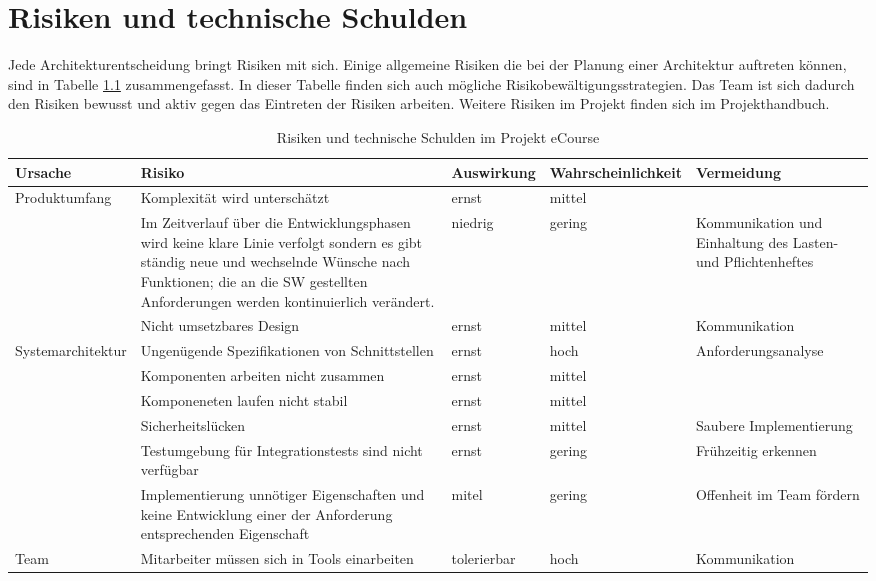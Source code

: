 \chapter{Risiken und technische Schulden}
Jede Architekturentscheidung bringt Risiken mit sich. Einige allgemeine Risiken die bei der Planung einer Architektur auftreten können, sind in Tabelle \ref{tab:Risiken} zusammengefasst. In dieser Tabelle finden sich auch mögliche Risikobewältigungsstrategien. Das Team ist sich dadurch den Risiken bewusst und aktiv gegen das Eintreten der Risiken arbeiten. Weitere Risiken im Projekt finden sich im Projekthandbuch.

\begin{table}
    \centering
    \tiny
    \begin{tabularx}{\textwidth}{|l|X|l|l|X|} 
        \hline 
        Ursache & Risiko & Auswirkung & Wahrscheinlichkeit & Vermeidung \\ 
        \hline
        Produktumfang & Komplexität wird unterschätzt & ernst & mittel &  \\ 
        \hline
            & Im Zeitverlauf über die Entwicklungsphasen wird keine klare Linie verfolgt sondern es gibt ständig neue und wechselnde Wünsche nach Funktionen; die an die SW gestellten Anforderungen werden kontinuierlich verändert. & niedrig &
            gering & Kommunikation und Einhaltung des Lasten- und Pflichtenheftes \\ 
        \hline
            & Nicht umsetzbares Design & ernst & mittel & Kommunikation  \\ 
        \hline
        Systemarchitektur & Ungenügende Spezifikationen von Schnittstellen & ernst & hoch & Anforderungsanalyse \\ 
        \hline
            & Komponenten arbeiten nicht zusammen & ernst & mittel &  \\ 
        \hline
            & Komponeneten laufen nicht stabil & ernst & mittel &  \\ 
        \hline
            & Sicherheitslücken & ernst & mittel & Saubere Implementierung \\ 
        \hline
            & Testumgebung für Integrationstests sind nicht verfügbar & ernst & gering & Frühzeitig erkennen \\ 
        \hline
            & Implementierung unnötiger Eigenschaften und keine Entwicklung einer der Anforderung entsprechenden Eigenschaft & mitel & gering & Offenheit im Team fördern \\ 
        \hline
        Team & Mitarbeiter müssen sich in Tools einarbeiten & tolerierbar & hoch & Kommunikation  \\ 
        \hline
    \end{tabularx}
    \caption{Risiken und technische Schulden im Projekt eCourse}
    \label{tab:Risiken}
\end{table}